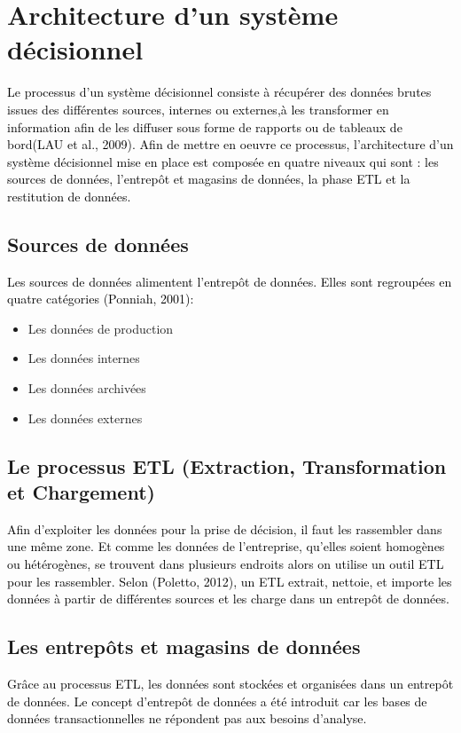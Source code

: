 \documentclass[a4paper,12pt]{report}
\begin{document}
	
\section{Architecture d’un système décisionnel}	
\textcolor{black}{Le processus d’un système décisionnel consiste à récupérer des données brutes issues des différentes sources, internes ou externes,à les transformer en information afin de les diffuser sous forme de rapports ou de tableaux de bord(LAU et al., 2009).}
\textcolor{black}{Afin de mettre en oeuvre ce processus, l’architecture d’un système décisionnel mise en place est composée en quatre niveaux qui sont : les sources de données, l’entrepôt et magasins de données, la phase ETL et la restitution de données.}

\subsection{Sources de données}
\textcolor{black}{Les sources de données alimentent l’entrepôt de données. Elles sont regroupées en quatre catégories (Ponniah, 2001):}

\begin{itemize}
	\item  Les données de production
	\item  Les données internes
	\item  Les données archivées
	\item  Les données externes
\end{itemize}	


\subsection{Le processus ETL (Extraction, Transformation et Chargement)}
\textcolor{black}{Afin d’exploiter les données pour la prise de décision, il faut les rassembler dans une même zone. Et comme les données de l’entreprise, qu’elles soient homogènes ou hétérogènes, se trouvent dans plusieurs endroits alors on utilise un outil ETL pour les rassembler.}
\textcolor{black}{Selon (Poletto, 2012), un ETL extrait, nettoie, et importe les données à partir de différentes sources et les charge dans un entrepôt de données.}

\subsection{Les entrepôts et magasins de données}
\textcolor{black}{Grâce au processus ETL, les données sont stockées et organisées dans un entrepôt de données. Le concept d’entrepôt de données a été introduit car les bases de données transactionnelles ne répondent pas aux besoins d’analyse.}
\end{document}
